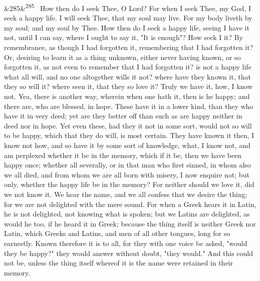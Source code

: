 \documentclass[12pt]{article}
\newcommand{\para}[1][]{\par\noindent\ifx&#1&\else\textsuperscript{\footnotesize #1}~\fi}
\begin{document}
\para[285] How then do I seek Thee, O Lord? For when I seek Thee, my God, I seek a happy life. I will seek Thee, that my soul may live. For my body liveth by my soul; and my soul by Thee. How then do I seek a happy life, seeing I have it not, until I can say, where I ought to say it, "It is enough"? How seek I it? By remembrance, as though I had forgotten it, remembering that I had forgotten it? Or, desiring to learn it as a thing unknown, either never having known, or so forgotten it, as not even to remember that I had forgotten it? is not a happy life what all will, and no one altogether wills it not? where have they known it, that they so will it? where seen it, that they so love it? Truly we have it, how, I know not. Yea, there is another way, wherein when one hath it, then is he happy; and there are, who are blessed, in hope. These have it in a lower kind, than they who have it in very deed; yet are they better off than such as are happy neither in deed nor in hope. Yet even these, had they it not in some sort, would not so will to be happy, which that they do will, is most certain. They have known it then, I know not how, and so have it by some sort of knowledge, what, I know not, and am perplexed whether it be in the memory, which if it be, then we have been happy once; whether all severally, or in that man who first sinned, in whom also we all died, and from whom we are all born with misery, I now enquire not; but only, whether the happy life be in the memory? For neither should we love it, did we not know it. We hear the name, and we all confess that we desire the thing; for we are not delighted with the mere sound. For when a Greek hears it in Latin, he is not delighted, not knowing what is spoken; but we Latins are delighted, as would he too, if he heard it in Greek; because the thing itself is neither Greek nor Latin, which Greeks and Latins, and men of all other tongues, long for so earnestly. Known therefore it is to all, for they with one voice be asked, "would they be happy?" they would answer without doubt, "they would." And this could not be, unless the thing itself whereof it is the name were retained in their memory.
\end{document}
